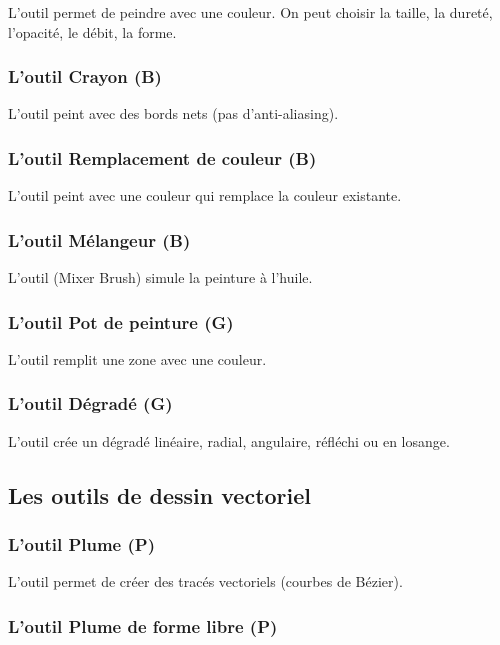 L'outil  permet de peindre avec une couleur. On peut choisir la taille, la dureté, l'opacité, le débit, la forme.

\subsubsection{L'outil Crayon (B)}

L'outil  peint avec des bords nets (pas d'anti-aliasing).

\subsubsection{L'outil Remplacement de couleur (B)}

L'outil  peint avec une couleur qui remplace la couleur existante.

\subsubsection{L'outil Mélangeur (B)}

L'outil  (Mixer Brush) simule la peinture à l'huile.

\subsubsection{L'outil Pot de peinture (G)}

L'outil  remplit une zone avec une couleur.

\subsubsection{L'outil Dégradé (G)}

L'outil  crée un dégradé linéaire, radial, angulaire, réfléchi ou en losange.

\subsection{Les outils de dessin vectoriel}

\subsubsection{L'outil Plume (P)}

L'outil  permet de créer des tracés vectoriels (courbes de Bézier).

\subsubsection{L'outil Plume de forme libre (P)}

